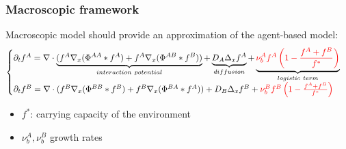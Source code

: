 \documentclass[10pt]{beamer}
\def \p {{\partial}}
\newcommand\Fontvii{\fontsize{9}{7.2}\selectfont}
\begin{document}
\begin{frame}
\frametitle{Macroscopic framework}
\Fontvii
Macroscopic model should provide an approximation of the agent-based model:
	\begin{equation}
\begin{cases}
\p_t f^{A}=  \nabla \cdot \underbrace{(f^A\nabla_x(\Phi^{AA}* f^A) + f^A \nabla_x( \Phi^{AB}*f^B))}_{interaction \ potential} + \underbrace{ D_A \Delta_x f^A}_{diffusion} + \underbrace{ \textcolor{red}{\nu_{b}^{A}f^A\left( 1-\frac{f^A+f^B}{f^{*}} \right)}}_{logistic \ term} \\

\p_t f^{B}=  \nabla \cdot (f^B\nabla_x(\Phi^{BB}* f^B) + f^B \nabla_x (\Phi^{BA}*f^A)) + D_B \Delta_x f^B + \textcolor{red}{\nu_{b}^{B}f^B\left( 1-\frac{f^A+f^B}{f^{*}} \right)}
\end{cases}
\end{equation}
\begin{itemize}
	\item  $f^*$: carrying capacity of the environment
	\item $\nu_{b}^{A},\nu_{b}^{B}$ growth rates
\end{itemize}


\end{frame}
\end{document}
